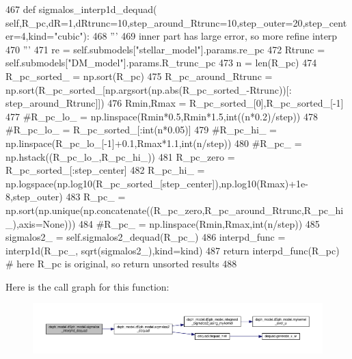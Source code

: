 \begin{DoxyCode}
467     \textcolor{keyword}{def }sigmalos\_interp1d\_dequad(
      self,R\_pc,dR=1,dRtrunc=10,step\_around\_Rtrunc=10,step\_outer=20,step\_center=4,kind="cubic"):
468         \textcolor{stringliteral}{'''}
469 \textcolor{stringliteral}{        inner part has large error, so more refine interp}
470 \textcolor{stringliteral}{        '''}
471         re = self.submodels[\textcolor{stringliteral}{"stellar\_model"}].params.re\_pc
472         Rtrunc = self.submodels[\textcolor{stringliteral}{"DM\_model"}].params.R\_trunc\_pc
473         n = len(R\_pc)
474         R\_pc\_sorted\_ = np.sort(R\_pc)
475         R\_pc\_around\_Rtrunc = np.sort(R\_pc\_sorted\_[np.argsort(np.abs(R\_pc\_sorted\_-Rtrunc))[:
      step\_around\_Rtrunc]])
476         Rmin,Rmax = R\_pc\_sorted\_[0],R\_pc\_sorted\_[-1]
477         \textcolor{comment}{#R\_pc\_lo\_ = np.linspace(Rmin*0.5,Rmin*1.5,int((n*0.2)/step))}
478         \textcolor{comment}{#R\_pc\_lo\_ = R\_pc\_sorted\_[:int(n*0.05)]}
479         \textcolor{comment}{#R\_pc\_hi\_ = np.linspace(R\_pc\_lo\_[-1]+0.1,Rmax*1.1,int(n/step))}
480         \textcolor{comment}{#R\_pc\_ = np.hstack((R\_pc\_lo\_,R\_pc\_hi\_))}
481         R\_pc\_zero = R\_pc\_sorted\_[:step\_center]
482         R\_pc\_hi\_ = np.logspace(np.log10(R\_pc\_sorted\_[step\_center]),np.log10(Rmax)+1e-8,step\_outer)
483         R\_pc\_ = np.sort(np.unique(np.concatenate((R\_pc\_zero,R\_pc\_around\_Rtrunc,R\_pc\_hi\_),axis=\textcolor{keywordtype}{None})))
484         \textcolor{comment}{#R\_pc\_ = np.linspace(Rmin,Rmax,int(n/step))}
485         sigmalos2\_ = self.sigmalos2\_dequad(R\_pc\_)
486         interpd\_func = interp1d(R\_pc\_, sqrt(sigmalos2\_),kind=kind)
487         \textcolor{keywordflow}{return} interpd\_func(R\_pc) \textcolor{comment}{# here R\_pc is original, so return unsorted results}
488     
\end{DoxyCode}
Here is the call graph for this function\+:\nopagebreak
\begin{figure}[H]
\begin{center}
\leavevmode
\includegraphics[width=350pt]{d0/d25/classdsph__model_1_1dSph__model_a239ec859750c30fe31b6c19e94cd2e33_cgraph}
\end{center}
\end{figure}
\mbox{\label{classdsph__model_1_1dSph__model_a1c6185c02a3f58951b7ed9b75a348f49}} 
